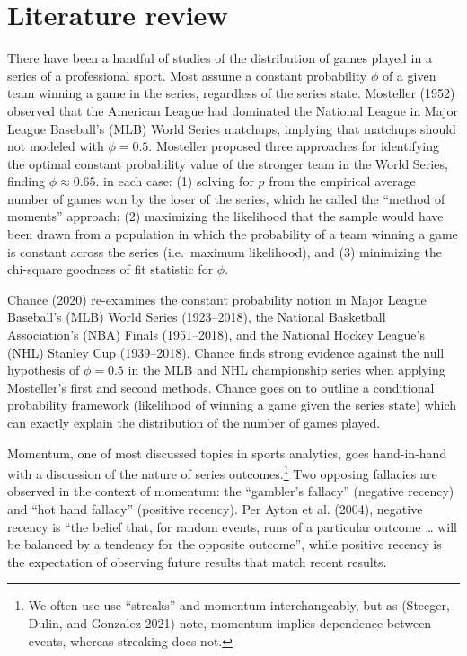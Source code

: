 \documentclass{article}
\begin{document}
\hypertarget{literature-review}{%
\section{Literature review}\label{literature-review}}

There have been a handful of studies of the distribution of games played
in a series of a professional sport. Most assume a constant probability
\(\phi\) of a given team winning a game in the series, regardless of the
series state. Mosteller (1952) observed that the American League had
dominated the National League in Major League Baseball's (MLB) World
Series matchups, implying that matchups should not modeled with
\(\phi = 0.5\). Mosteller proposed three approaches for identifying the
optimal constant probability value of the stronger team in the World
Series, finding \(\phi \approx 0.65\). in each case: (1) solving for
\(p\) from the empirical average number of games won by the loser of the
series, which he called the ``method of moments'' approach; (2)
maximizing the likelihood that the sample would have been drawn from a
population in which the probability of a team winning a game is constant
across the series (i.e.~maximum likelihood), and (3) minimizing the
chi-square goodness of fit statistic for \(\phi\).

Chance (2020) re-examines the constant probability notion in Major
League Baseball's (MLB) World Series (1923--2018), the National
Basketball Association's (NBA) Finals (1951--2018), and the National
Hockey League's (NHL) Stanley Cup (1939--2018). Chance finds strong
evidence against the null hypothesis of \(\phi = 0.5\) in the MLB and
NHL championship series when applying Mosteller's first and second
methods. Chance goes on to outline a conditional probability framework
(likelihood of winning a game given the series state) which can exactly
explain the distribution of the number of games played.

Momentum, one of most discussed topics in sports analytics, goes
hand-in-hand with a discussion of the nature of series
outcomes.\footnote{We often use use ``streaks'' and momentum
  interchangeably, but as (Steeger, Dulin, and Gonzalez 2021) note,
  momentum implies dependence between events, whereas streaking does
  not.} Two opposing fallacies are observed in the context of momentum:
the ``gambler's fallacy'' (negative recency) and ``hot hand fallacy''
(positive recency). Per Ayton et al. (2004), negative recency is ``the
belief that, for random events, runs of a particular outcome \ldots{}
will be balanced by a tendency for the opposite outcome'', while
positive recency is the expectation of observing future results that
match recent results.
\end{document}
